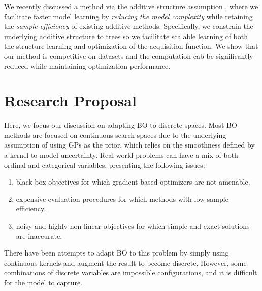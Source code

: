 \documentclass[
    american,a4paper
    ]{scrartcl}
\begin{document}
        We recently discussed a method via the additive structure assumption \cite{han2020high}, 
        where we facilitate faster model learning by \emph{reducing the model complexity} while retaining the \emph{sample-efficiency} of existing additive methods.
        Specifically, we constrain the underlying additive structure to trees so we facilitate scalable learning of both the structure learning and optimization of the acquisition function.
        We show that our method is competitive on datasets and the computation cab be significantly reduced while maintaining optimization performance.
        \section{Research Proposal}
        Here, we focus our discussion on adapting BO to discrete spaces. 
        Most BO methods are focused on continuous search spaces due to the underlying assumption of using GPs as the prior, 
        which relies on the smoothness defined by a kernel to model uncertainty. 
        Real world problems can have a mix of both ordinal and categorical variables, presenting the following issues:
        \begin{enumerate}
            \item black-box objectives for which gradient-based optimizers are not amenable.
            \item expensive evaluation procedures for which methods with low sample efficiency.
            \item noisy and highly non-linear objectives for which simple and exact solutions are inaccurate.
        \end{enumerate}
        There have been attempts to adapt BO to this problem by simply using continuous kernels and augment the result to become discrete. 
        However, some combinations of discrete variables are impossible configurations, and it is difficult for the model to capture.
\end{document}
